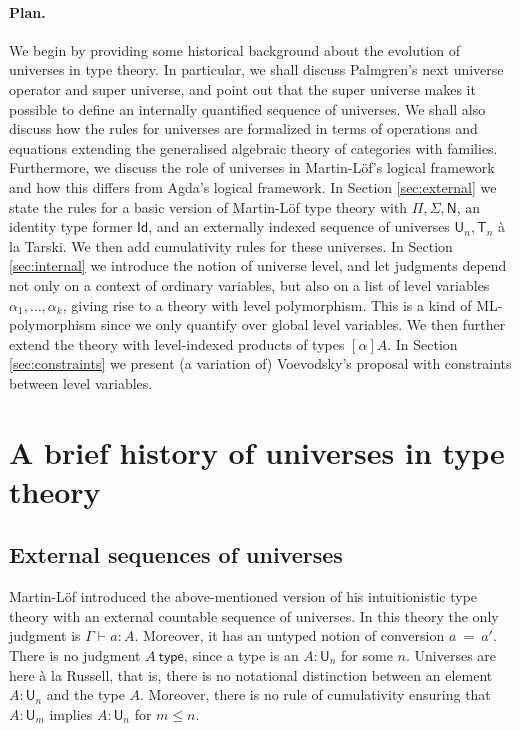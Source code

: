 \documentclass[11pt,a4paper]{article}
\newcommand{\Id}{\mathsf{Id}}
\newcommand{\conv}{=}
\def\NN{\mathsf{N}}
\def\UU{\mathsf{U}}
\newcommand{\type}{\mathsf{type}}
\newcommand{\T}{\mathsf{T}}
\begin{document}
\paragraph{Plan.} We begin by providing some historical background about the evolution of universes in type theory. In particular, we shall discuss Palmgren's next universe operator and super universe, and point out that the super universe makes it possible to define an internally quantified sequence of universes. We shall also discuss how the rules for universes are formalized in terms of operations and equations extending the generalised algebraic theory of categories with families. Furthermore, we discuss the role of universes in Martin-Löf's logical framework and how this differs from Agda's logical framework. In Section \ref{sec:external} we state the rules for a basic version of Martin-Löf type theory with $\Pi, \Sigma, \NN$, an identity type former $\Id$, and an externally indexed sequence of universes $\UU_n, \T_n$ \`a la Tarski. We then add cumulativity rules for these universes. In Section \ref{sec:internal} we introduce the notion of universe level, and let judgments depend not only on a context of ordinary variables, but also on a list of level variables $\alpha_1, \ldots, \alpha_k$, giving rise to a theory with level polymorphism. This is a kind of ML-polymorphism since we only quantify over global level variables. We then further extend the theory with level-indexed products of types $[\alpha]A$. In Section \ref{sec:constraints} we present (a variation of) Voevodsky's proposal with constraints between level variables. 



\section{A brief history of universes in type theory}\label{sec:history}

\subsection{External sequences of universes}\label{sec:palmgren}

Martin-Löf \cite{martinlof:predicative} introduced the above-mentioned version of his intuitionistic type theory with an external countable sequence of universes. In this theory the only judgment is  $\Gamma \vdash a : A$. Moreover, it has an untyped notion of conversion $a\ \conv\ a'$. There is no judgment $A\ \type$, since a type is an $A : \UU_n$ for some $n$. Universes are here \`a la Russell, that is, there is no notational distinction between an element $A : \UU_n$ and the type $A$. Moreover, there is no rule of cumulativity ensuring that $A : \UU_m$ implies $A : \UU_n$ for $m \leq n$.
\end{document}
